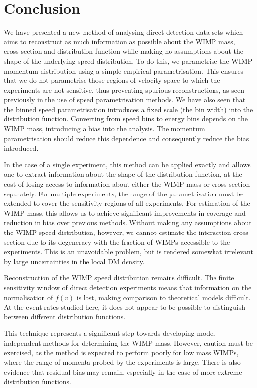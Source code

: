 \section{Conclusion}
\label{sec:Speed:Conclusion}

We have presented a new method of analysing direct detection data sets which aims to reconstruct as much information as possible about the WIMP mass, cross-section and distribution function while making no assumptions about the shape of the underlying speed distribution. To do this, we parametrise the WIMP momentum distribution using a simple empirical parametrisation. This ensures that we do not parametrise those regions of velocity space to which the experiments are not sensitive, thus preventing spurious reconstructions, as seen previously in the use of speed parametrisation methods. We have also seen that the binned speed parametrisation introduces a fixed scale (the bin width) into the distribution function. Converting from speed bins to energy bins depends on the WIMP mass, introducing a bias into the analysis. The momentum parametrisation should reduce this dependence and consequently reduce the bias introduced.

In the case of a single experiment, this method can be applied exactly and allows one to extract information about the shape of the distribution function, at the cost of losing access to information about either the WIMP mass or cross-section separately. For multiple experiments, the range of the parametrisation must be extended to cover the sensitivity regions of all experiments. For estimation of the WIMP mass, this allows us to achieve significant improvements in coverage and reduction in bias over previous methods. Without making any assumptions about the WIMP speed distribution, however, we cannot estimate the interaction cross-section due to its degeneracy with the fraction of WIMPs accessible to the experiments. This is an unavoidable problem, but is rendered somewhat irrelevant by large uncertainties in the local DM density.

Reconstruction of the WIMP speed distribution remains difficult. The finite sensitivity window of direct detection experiments means that information on the normalisation of \(f(v)\) is lost, making comparison to theoretical models difficult. At the event rates studied here, it does not appear to be possible to distinguish between different distribution functions.

This technique represents a significant step towards developing model-independent methods for determining the WIMP mass. However, caution must be exercised, as the method is expected to perform poorly for low mass WIMPs, where the range of momenta probed by the experiments is large. There is also evidence that residual bias may remain, especially in the case of more extreme distribution functions.



